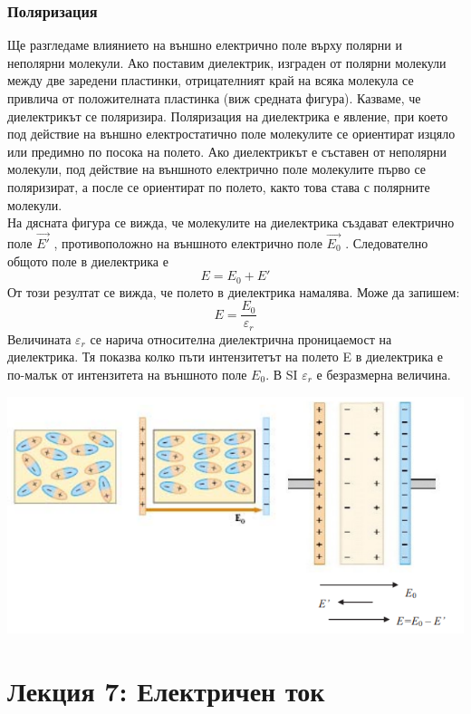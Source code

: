 \documentclass[fleqn, 12pt]{article}
\theoremstyle{definition}
\begin{document}
\subsubsection{Поляризация}
Ще разгледаме влиянието на външно електрично поле върху полярни и
неполярни молекули. Ако поставим диелектрик, изграден от полярни молекули между
две заредени пластинки, отрицателният край на всяка молекула се привлича от
положителната пластинка (виж средната фигура). Казваме, че диелектрикът се
поляризира. Поляризация на диелектрика е явление, при което под действие на външно
електростатично поле молекулите се ориентират изцяло или предимно по посока на
полето. Ако диелектрикът е съставен от неполярни молекули, под действие на
външното електрично поле молекулите първо се поляризират, а после се ориентират по
полето, както това става с полярните молекули. \\
На дясната фигура се вижда, че молекулите на диелектрика създават електрично
поле $\vec{E'}$ , противоположно на външното електрично поле $\vec{E_0}$ . Следователно общото
поле в диелектрика е 
$$E = E_0 + E'$$
От този резултат се вижда, че полето в диелектрика намалява. Може да запишем: 
$$E = \frac{E_0}{\varepsilon_r}$$
Величината $\varepsilon_r$ се нарича относителна диелектрична проницаемост на
диелектрика. Тя показва колко пъти интензитетът на полето E в диелектрика е по-малък
от интензитета на външното поле $E_0$. В SI $\varepsilon_r$ е безразмерна величина. 
\begin{center}
  \includegraphics{Pics/physics/lec6-9-2.png}
\end{center}

\newpage
\section{Лекция 7: Електричен ток}
\end{document}
